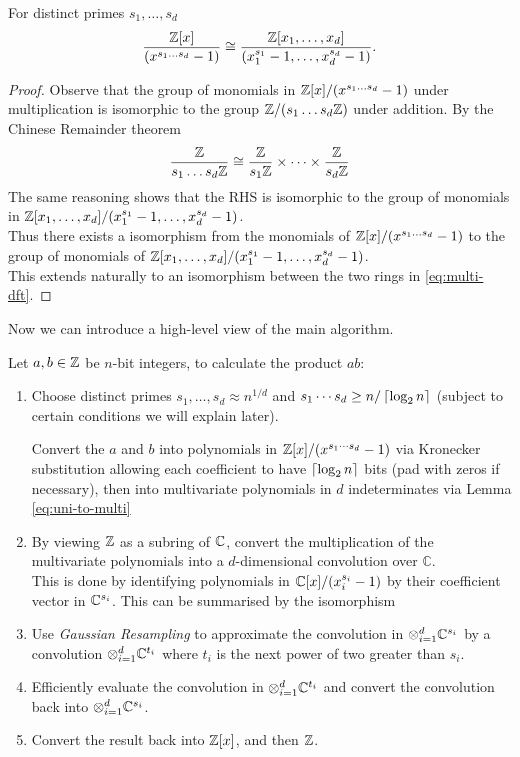 \begin{lemma}\label{eq:uni-to-multi}
    For distinct primes $s_1, \ldots, s_d$
    \begin{equation}\label{eq:multi-dft}
        \frac{{\mathbb Z}[x]}{(x^{s_1\ldots s_d} - 1)} \cong \frac{{\mathbb Z}[x_1, \ldots, x_d]}{(x_1^{s_1} - 1, \ldots, x_d^{s_d} - 1)}.
    \end{equation}
\end{lemma}

\begin{proof}
    Observe that the group of monomials in ${\mathbb Z}[x]/(x^{s_1\ldots s_d} - 1)$ under multiplication is isomorphic to the group ${\mathbb Z}/(s_1 \ldots s_d{\mathbb Z})$ under addition. By the Chinese Remainder theorem
    \[
        \frac{{\mathbb Z}}{s_1\ldots s_d {\mathbb Z}} \cong \frac{{\mathbb Z}}{s_1 {\mathbb Z}} \times \cdots \times \frac{{\mathbb Z}}{s_d {\mathbb Z}}
    \]
    The same reasoning shows that the RHS is isomorphic to the group of monomials in ${\mathbb Z}[x_1, \ldots, x_d]/(x_1^{s_1} - 1, \ldots, x_d^{s_d} - 1)$.\\
    Thus there exists a isomorphism from the monomials of ${\mathbb Z}[x]/(x^{s_1\ldots s_d} - 1)$ to the group of monomials of ${\mathbb Z}[x_1, \ldots, x_d]/(x_1^{s_1} - 1, \ldots, x_d^{s_d} - 1)$.\\
    This extends naturally to an isomorphism between the two rings in \eqref{eq:multi-dft}.
\end{proof}

Now we can introduce a high-level view of the main algorithm.

Let $a, b \in {\mathbb Z}$ be $n$-bit integers, to calculate the product $ab$:

\begin{enumerate}
    \item  Choose distinct primes $s_1, \ldots, s_d \approx n^{1/d}$ and $s_1\cdots s_d \ge n/\left \lceil \log_2 n \right \rceil$ (subject to certain conditions we will explain later).

        Convert the $a$ and $b$ into polynomials in ${\mathbb Z}[x]/(x^{s_1\cdots s_d} - 1)$ via Kronecker substitution allowing each coefficient to have $\left \lceil \log_2 n \right \rceil$ bits (pad with zeros if necessary), then into multivariate polynomials in $d$ indeterminates via Lemma \ref{eq:uni-to-multi}
    \item By viewing ${\mathbb Z}$ as a subring of ${\mathbb C}$, convert the multiplication of the multivariate polynomials into a $d$-dimensional convolution over $\mathbb{C}$.\\
        This is done by identifying polynomials in ${\mathbb C}[x]/(x_i^{s_i} - 1)$ by their coefficient vector in ${\mathbb C}^{s_i}$. This can be summarised by the isomorphism
    \item Use \emph{Gaussian Resampling} to approximate the convolution in $\otimes_{i=1}^d {\mathbb C}^{s_i}$ by a convolution $\otimes_{i=1}^d {\mathbb C}^{t_i}$ where $t_i$ is the next power of two greater than $s_i$.
    \item Efficiently evaluate the convolution in $\otimes_{i=1}^d {\mathbb C}^{t_i}$ and convert the convolution back into $\otimes_{i=1}^d {\mathbb C}^{s_i}$.
    \item Convert the result back into ${\mathbb Z}[x]$, and then ${\mathbb Z}$.
\end{enumerate}

